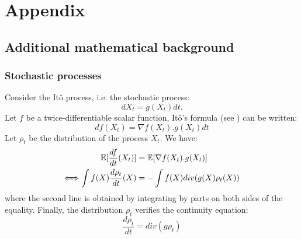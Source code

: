 

\section{Appendix}\label{sec:appendix}

\subsection{Additional mathematical background}



\subsubsection{Stochastic processes}\label{sec:ito_stochastic}

Consider the Itô process, i.e. the stochastic process:
\begin{equation}
dX_t=g(X_t)dt.
\end{equation}
Let $f$ be a twice-differentiable scalar function, Itô's formula (see \cite{ito1951stochastic}) can be written:
\begin{equation}
df(X_t)=\nabla f(X_t).g(X_t)dt
\end{equation}
Let $\rho_t$ be the distribution of the process $X_t$. We have:
\begin{align}
{{\mathbb E}}[\frac{df}{dt}(X_t)]&= {{\mathbb E}}[\nabla f(X_t).g(X_t)]\\
\Longleftrightarrow \int f(X) \frac{d \rho_t}{dt}(X)&=-\int f(X)div(g(X)\rho_t(X))
\end{align}
where the second line is obtained by integrating by parts on both sides of the equality. Finally, the distribution $\rho_t$ verifies the continuity equation: 
\begin{equation}
\frac{d\rho_t}{dt}=div(g\rho_t)
\end{equation}


